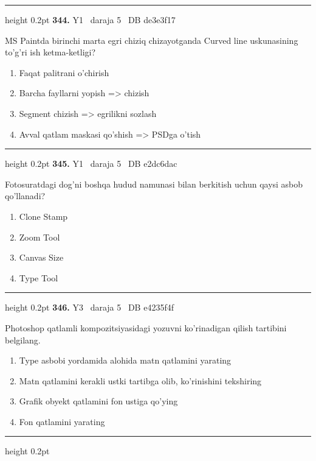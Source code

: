 \documentclass[10pt,a4paper,oneside]{article}
\begin{document}
\vspace{2mm}\hrule height 0.2pt \vspace{4mm}
\hypertarget{q344}{\textbf{\color{ink}344.}}  {\color{muted}\scriptsize Y1 \textbullet\ daraja 5 \textbullet\ DB de3e3f17}
\par
MS Paintda birinchi marta egri chiziq chizayotganda Curved line uskunasining to'g'ri ish ketma-ketligi?
\begin{enumerate}[label=\Alph*),leftmargin=9mm]
\item Faqat palitrani o'chirish
\item Barcha fayllarni yopish =\textgreater{} chizish
\item Segment chizish =\textgreater{} egrilikni sozlash
\item Avval qatlam maskasi qo'shish =\textgreater{} PSDga o'tish
\end{enumerate}
\vspace{2mm}\hrule height 0.2pt \vspace{4mm}
\hypertarget{q345}{\textbf{\color{ink}345.}}  {\color{muted}\scriptsize Y1 \textbullet\ daraja 5 \textbullet\ DB e2dc6dac}
\par
Fotosuratdagi dog'ni boshqa hudud namunasi bilan berkitish uchun qaysi asbob qo'llanadi?
\begin{enumerate}[label=\Alph*),leftmargin=9mm]
\item Clone Stamp
\item Zoom Tool
\item Canvas Size
\item Type Tool
\end{enumerate}
\vspace{2mm}\hrule height 0.2pt \vspace{4mm}
\hypertarget{q346}{\textbf{\color{ink}346.}}  {\color{muted}\scriptsize Y3 \textbullet\ daraja 5 \textbullet\ DB e4235f4f}
\par
Photoshop qatlamli kompozitsiyasidagi yozuvni ko'rinadigan qilish tartibini belgilang.
\begin{enumerate}[label=\Alph*),leftmargin=9mm]
\item Type asbobi yordamida alohida matn qatlamini yarating
\item Matn qatlamini kerakli ustki tartibga olib, ko'rinishini tekshiring
\item Grafik obyekt qatlamini fon ustiga qo'ying
\item Fon qatlamini yarating
\end{enumerate}
\vspace{2mm}\hrule height 0.2pt \vspace{4mm}
\end{document}
